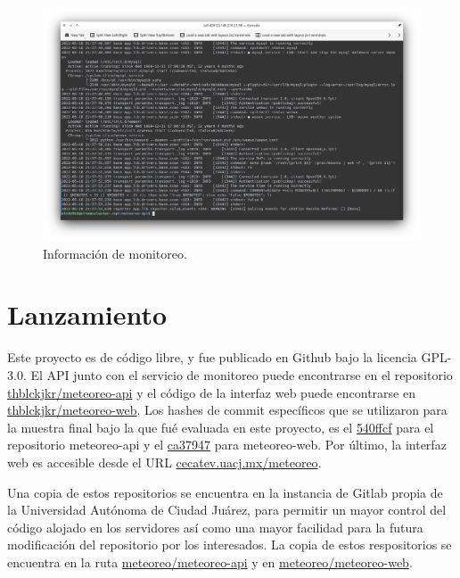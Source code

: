 \begin{figure}[!ht]
	\centering
	\includegraphics[width=1\linewidth]{images/screenshots/meteoreo-api-monitoring.png}
	\caption{Información de monitoreo.}
	\label{fig:meteoreo-api-monitoring}
\end{figure}

\clearpage

\section{Lanzamiento}

Este proyecto es de código libre, y fue publicado en Github bajo la licencia GPL-3.0. El API junto con el servicio de monitoreo puede encontrarse en el repositorio \href{https://github.com/thblckjkr/meteoreo-api}{thblckjkr/meteoreo-api} y el código de la interfaz web puede encontrarse en \href{https://github.com/thblckjkr/meteoreo-web}{thblckjkr/meteoreo-web}. Los hashes de commit específicos que se utilizaron para la muestra final bajo la que fué evaluada en este proyecto, es el \href{https://github.com/thblckjkr/meteoreo-api/tree/540ffcf1a00a6ad57887ec69a6095b5636a29806}{540ffcf} para el repositorio meteoreo-api y el \href{https://github.com/thblckjkr/meteoreo-web/tree/ca3794735bb03d2b9ca7fad49f53bf0b369fbe92}{ca37947} para meteoreo-web. Por último, la interfaz web es accesible desde el URL \href{http://cecatev.uacj.mx/meteoreo}{cecatev.uacj.mx/meteoreo}.

Una copia de estos repositorios se encuentra en la instancia de Gitlab propia de la Universidad Autónoma de Ciudad Juárez, para permitir un mayor control del código alojado en los servidores así como una mayor facilidad para la futura modificación del repositorio por los interesados. La copia de estos respositorios se encuentra en la ruta \href{https://git.uacj.mx/meteoreo/meteoreo-api/}{meteoreo/meteoreo-api} y en \href{https://git.uacj.mx/meteoreo/meteoreo-web/}{meteoreo/meteoreo-web}.
